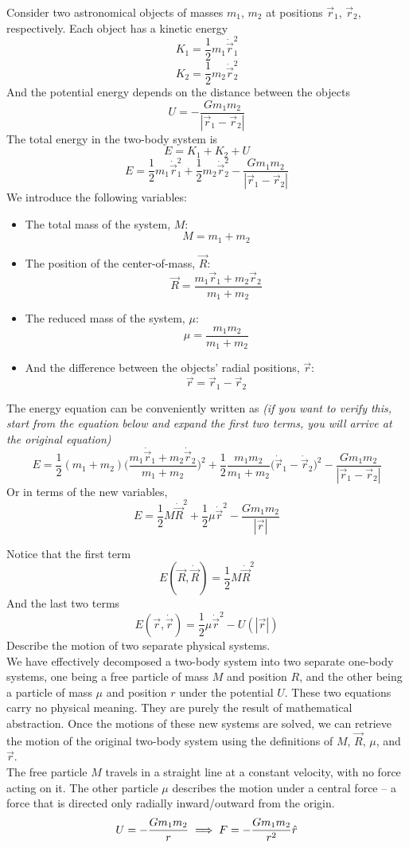 \documentclass[11pt]{article}
\theoremstyle{gangnamstyle}{\newtheorem{definition}{Definition}[]}
\theoremstyle{gangnamstyle}{\newtheorem{example}{Example}[]}
\theoremstyle{gangnamstyle}{\newtheorem{problem}{Problem}[]}
\theoremstyle{gangnamstyle}{\newtheorem{warning}{Warning}[]}
\begin{document}
Consider two astronomical objects of masses $m_1$, $m_2$ at positions $\Vec{r}_1$, $\Vec{r}_2$, respectively. Each object has a kinetic energy
\[ K_1 = \frac{1}{2}m_1\Dot{\Vec{r}}_1^2 \]
\[ K_2 = \frac{1}{2}m_2\Dot{\Vec{r}}_2^2 \]
And the potential energy depends on the distance between the objects
\[ U = -\frac{Gm_1m_2}{|\Vec{r}_1 - \Vec{r}_2|} \]
The total energy in the two-body system is
\[ E = K_1 + K_2 + U \]
\[ E = \frac{1}{2}m_1\Dot{\Vec{r}}_1^2 + \frac{1}{2}m_2\Dot{\Vec{r}}_2^2 - \frac{Gm_1m_2}{|\Vec{r}_1 - \Vec{r}_2|} \]
We introduce the following variables: 
\begin{itemize}
\item The total mass of the system, $M$:
\[ M = m_1 + m_2 \]
\item The position of the center-of-mass, $\Vec{R}$:
\[ \Vec{R} = \frac{m_1\Vec{r}_1 + m_2\Vec{r}_2}{m_1 + m_2} \]
\item The reduced mass of the system, $\mu$:
\[ \mu = \frac{m_1m_2}{m_1 + m_2} \]
\item And the difference between the objects' radial positions, $\Vec{r}$:
\[ \Vec{r} = \Vec{r}_1 - \Vec{r}_2 \]
\end{itemize}
The energy equation can be conveniently written as \textit{(if you want to verify this, start from the equation below and expand the first two terms, you will arrive at the original equation)}
\[ E = \frac{1}{2}(m_1 + m_2)\Big(\frac{m_1\Dot{\Vec{r}}_1 + m_2\Dot{\Vec{r}}_2}{m_1 + m_2}\Big)^2 + \frac{1}{2}\frac{m_1m_2}{m_1 + m_2}\Big(\Dot{\Vec{r}}_1 - \Dot{\Vec{r}}_2 \Big)^2 - \frac{Gm_1m_2}{|\Vec{r}_1 - \Vec{r}_2|} \]
Or in terms of the new variables, 
\[ E = \frac{1}{2} M\Dot{\Vec{R}}^2 + \frac{1}{2}\mu\Dot{\Vec{r}}^2 - \frac{Gm_1m_2}{|\Vec{r}|} \]

Notice that the first term
\[ E(\Vec{R}, \Dot{\Vec{R}}) = \frac{1}{2} M\Dot{\Vec{R}}^2 \]
And the last two terms
\[ E(\Vec{r}, \Dot{\Vec{r}}) = \frac{1}{2}\mu\Dot{\Vec{r}}^2 - U(|\Vec{r}|) \]
Describe the motion of two separate physical systems. \\

We have effectively decomposed a two-body system into two separate one-body systems, one being a free particle of mass $M$ and position $R$, and the other being a particle of mass $\mu$ and position $r$ under the potential $U$. These two equations carry no physical meaning. They are purely the result of mathematical abstraction. Once the motions of these new systems are solved, we can retrieve the motion of the original two-body system using the definitions of $M$, $\Vec{R}$, $\mu$, and $\Vec{r}$. \\
The free particle $M$ travels in a straight line at a constant velocity, with no force acting on it. The other particle $\mu$ describes the motion under a central force -- a force that is directed only radially inward/outward from the origin. 
\[ U = - \frac{Gm_1m_2}{r} \implies F = - \frac{Gm_1m_2}{r^2}\Hat{r} \]
\end{document}
